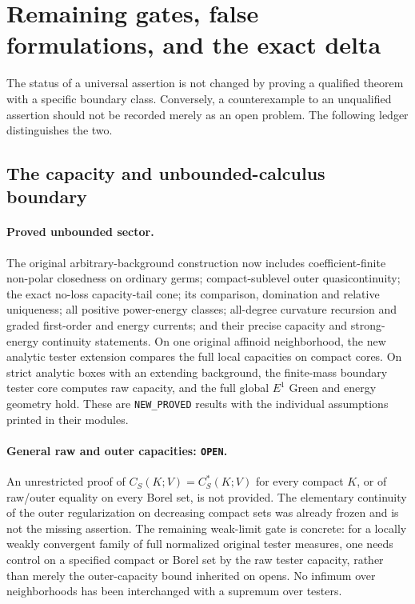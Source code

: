 \documentclass[11pt,a4paper]{article}
\numberwithin{equation}{section}
\theoremstyle{definition}
\theoremstyle{remark}
\begin{document}
\section{Remaining gates, false formulations, and the exact delta}
\label{sec:r11-remaining-gates}

The status of a universal assertion is not changed by
proving a qualified theorem with a specific boundary
class.  Conversely, a counterexample to an unqualified
assertion should not be recorded merely as an open
problem.  The following ledger distinguishes the two.

\subsection{The capacity and unbounded-calculus boundary}

\paragraph{Proved unbounded sector.}
The original arbitrary-background construction now includes
coefficient-finite non-polar closedness on ordinary germs;
compact-sublevel outer quasicontinuity; the exact no-loss
capacity-tail cone; its comparison, domination and
relative uniqueness; all positive power-energy classes;
all-degree curvature recursion and graded first-order
and energy currents; and their precise capacity and
strong-energy continuity statements.
On one original affinoid neighborhood, the new analytic
tester extension compares the full local capacities
on compact cores.
On strict analytic boxes with an extending background,
the finite-mass boundary tester core computes raw
capacity, and the full global $E^1$ Green and energy
geometry hold.
These are \texttt{NEW\_PROVED} results with the
individual assumptions printed in their modules.

\paragraph{General raw and outer capacities: \texttt{OPEN}.}
An unrestricted proof of
$C_S(K;V)=C_S^*(K;V)$ for every compact $K$,
or of raw/outer equality on every Borel set, is not
provided.  The elementary continuity of the outer
regularization on decreasing compact sets was already
frozen and is not the missing assertion.
The remaining weak-limit gate is concrete: for a
locally weakly convergent family of full normalized
original tester measures, one needs control on a
specified compact or Borel set by the raw tester
capacity, rather than merely the outer-capacity
bound inherited on opens.
No infimum over neighborhoods has been interchanged
with a supremum over testers.
\end{document}

